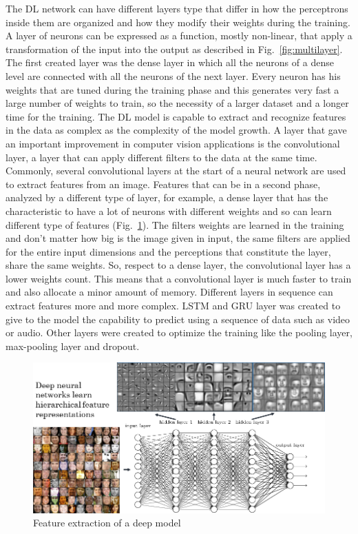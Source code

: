 \documentclass[12pt]{report}
\begin{document}
The DL network can have different layers type that differ in how the perceptrons inside them are organized and 
how they modify their weights during the training. 
A layer of neurons can be expressed as a function, mostly non-linear, that apply a transformation of the input into the output as described in Fig.~\ref{fig:multilayer}.
The first created layer was the dense layer in which all the neurons of a dense level are connected
with all the neurons of the next layer. Every neuron has his weights that are tuned during the training phase
and this generates very fast a large number of weights to train, so the necessity of a larger
dataset and a longer time for the training. 
The DL model is capable to extract and recognize features in the data as complex as the complexity of the model growth.
A layer that gave an important improvement in computer vision applications is the
convolutional layer, a layer that can apply different filters to the data at the same time.
Commonly, several convolutional layers at the start of a neural network are used to extract features from an image. Features that can be 
in a second phase, analyzed by a different type of layer, for example, a dense layer that has the characteristic to have a lot of neurons with different weights
and so can learn different type of features (Fig.~\ref{fig:featuresextract}).
The filters weights are learned in the training and don't matter how big is the image given in input,
the same filters are applied for the entire input dimensions and the perceptions that constitute the layer,
share the same weights. So, respect to a dense layer, the convolutional layer has a lower weights count. 
This means that a convolutional layer is much faster to train and also allocate a minor amount of memory.
Different layers in sequence can extract features more and more complex. 
LSTM and GRU layer was created to give to the model the capability to predict using a sequence of data such as video or audio.
Other layers were created to optimize the training like the pooling layer, max-pooling layer and dropout.


\begin{figure}[t]
    \centering
    \includegraphics[scale=.5]{layers-features.png}
    \caption{Feature extraction of a deep model \cite{featuresextract}}
    \label{fig:featuresextract}
\end{figure}
\end{document}
